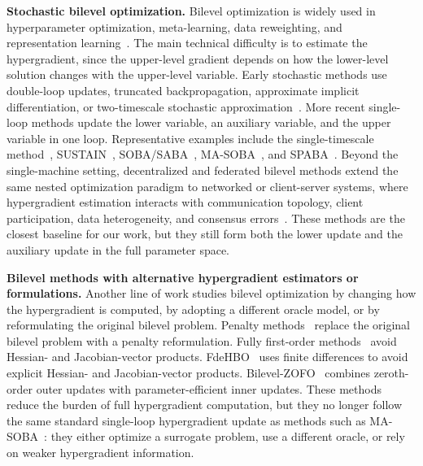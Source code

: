 \documentclass{pkumelon}
\theoremstyle{plain}
\begin{document}
\textbf{Stochastic bilevel optimization. }
Bilevel optimization is widely used in hyperparameter optimization, meta-learning, data reweighting, and representation learning~\citep{franceschi2018bilevel,rajeswaran2019meta,bertinetto2018meta,ren2018learning,huang2024optimal}. The main technical difficulty is to estimate the hypergradient, since the upper-level gradient depends on how the lower-level solution changes with the upper-level variable. Early stochastic methods use double-loop updates, truncated backpropagation, approximate implicit differentiation, or two-timescale stochastic approximation~\citep{ghadimi2018approximation,hong2023two,ji2021bilevel,arbel2021amortized,chen2021tighter}. More recent single-loop methods update the lower variable, an auxiliary variable, and the upper variable in one loop. Representative examples include the single-timescale method~\citep{ghadimi2020single}, SUSTAIN~\citep{khanduri2021near}, SOBA/SABA~\citep{dagreou2022framework}, MA-SOBA~\citep{chen2024optimal}, and SPABA~\citep{chu2024spaba}. Beyond the single-machine setting, decentralized and federated bilevel methods extend the same nested optimization paradigm to networked or client-server systems, where hypergradient estimation interacts with communication topology, client participation, data heterogeneity, and consensus errors~\citep{yang2022decentralized,chen2023decentralized,tarzanagh2022fednest,li2023communication,yang2023simfbo,kong2025decentralized,zhu2024sparkle,yang2025first,he2024distributed}. These methods are the closest baseline for our work, but they still form both the lower update and the auxiliary update in the full parameter space.

\textbf{Bilevel methods with alternative hypergradient estimators or formulations. }
Another line of work studies bilevel optimization by changing how the hypergradient is computed, by adopting a different oracle model, or by reformulating the original bilevel problem. Penalty methods~\citep{mehra2021penalty,kwon2023penalty} replace the original bilevel problem with a penalty reformulation. Fully first-order methods~\citep{li2022fully,kwon2023fully} avoid Hessian- and Jacobian-vector products. FdeHBO~\citep{yang2023achieving} uses finite differences to avoid explicit Hessian- and Jacobian-vector products. Bilevel-ZOFO~\citep{shirkavand2025bilevel} combines zeroth-order outer updates with parameter-efficient inner updates. These methods reduce the burden of full hypergradient computation, but they no longer follow the same standard single-loop hypergradient update as methods such as MA-SOBA~\citep{chen2024optimal}: they either optimize a surrogate problem, use a different oracle, or rely on weaker hypergradient information.
\end{document}
